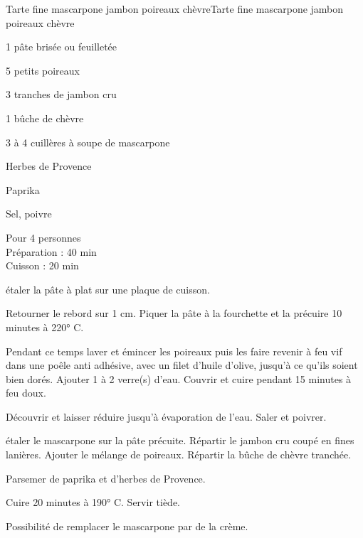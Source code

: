 \begin{recette}{Tarte fine mascarpone jambon poireaux chèvre}{Tarte fine mascarpone jambon poireaux chèvre}

\begin{ingredients}
1 pâte brisée ou feuilletée\par
5 petits poireaux\par
3 tranches de jambon cru\par
1 bûche de chèvre\par
3 à 4 cuillères à soupe de mascarpone\par
Herbes de Provence\par
Paprika\par
Sel, poivre\par
\end{ingredients}

\begin{infos}
Pour 4 personnes\\
Préparation : 40 min\\
Cuisson : 20 min\\
\end{infos}

\begin{etapes}
\item étaler la pâte à plat sur une plaque de cuisson.
\item Retourner le rebord sur 1 cm. Piquer la pâte à la fourchette et la précuire 10 minutes à 220° C.
\item Pendant ce temps laver et émincer les poireaux puis les faire revenir à feu vif dans une poêle anti adhésive, avec un filet d'huile d'olive, jusqu'à ce qu'ils soient bien dorés. Ajouter 1 à 2 verre(s) d'eau. Couvrir et cuire pendant 15 minutes à feu doux.
\item Découvrir et laisser réduire jusqu'à évaporation de l'eau. Saler et poivrer.
\item étaler le mascarpone sur la pâte précuite. Répartir le jambon cru coupé en fines lanières. Ajouter le mélange de poireaux. Répartir la bûche de chèvre tranchée.
\item Parsemer de paprika et d'herbes de Provence.
\item Cuire 20 minutes à 190° C. Servir tiède.
\end{etapes}

\begin{conseils}
Possibilité de remplacer le mascarpone par de la crème.
\end{conseils}

\end{recette}